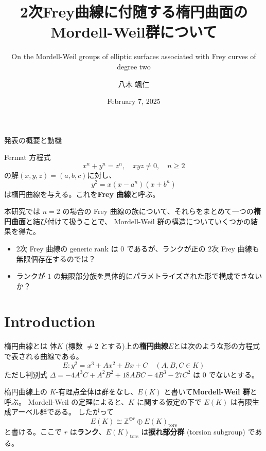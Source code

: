 \documentclass{classes/mybeamer}
\title{2次Frey曲線に付随する楕円曲面のMordell-Weil群について}
\subtitle{On the Mordell-Weil groups of elliptic surfaces associated with Frey curves of degree two}
\author{八木 颯仁}
\institute{慶應義塾大学 栗原研究室 修士2年}
\date{February 7, 2025}
\begin{document}
\begin{frame}
    \titlepage
\end{frame}

\begin{frame}{発表の概要と動機}
    \begin{dfn*}
        Fermat 方程式
        \begin{equation}
            x^n + y^n = z^n, \quad xyz \neq 0, \quad n \geq 2
        \end{equation}
        の解$(x, y, z)=(a,b,c)$に対し、
        \begin{equation}
            y^2 = x (x-a^n) (x+b^n)
        \end{equation}
        は楕円曲線を与える。これを\color{blue}\textbf{Frey 曲線}\color{black}と呼ぶ。
    \end{dfn*}
    本研究では $n=2$ の場合の Frey 曲線の族について、それらをまとめて一つの\textbf{楕円曲面}と結び付けて扱うことで、 Mordell-Weil 群の構造についていくつかの結果を得た。
    \begin{itemize}
        \item 2次 Frey 曲線の generic rank は $0$ であるが、ランクが正の 2次 Frey 曲線も無限個存在するのでは？
        \item ランクが $1$ の無限部分族を具体的にパラメトライズされた形で構成できないか？
    \end{itemize}
    \vspace{1em}
    \tableofcontents
\end{frame}

\section{Introduction}
\begin{frame}{楕円曲線とは}
    体$K$ (標数 $\neq2$ とする)上の\color{blue}\textbf{楕円曲線}\color{black}$E$とは次のような形の方程式で表される曲線である。
    \begin{equation*}
        E: y^{2} = x^{3} + Ax^2 + Bx + C \quad (A,B,C \in K)
    \end{equation*}
    ただし判別式 $\Delta = -4A^3C + A^2B^2 + 18ABC - 4B^3 - 27C^2$ は $0$ でないとする。

    \vspace{1cm}

    楕円曲線上の $K$-有理点全体は群をなし、$E(K)$ と書いて\color{blue}\textbf{Mordell-Weil 群}\color{black}と呼ぶ。
    Mordell-Weil の定理によると、$K$ に関する仮定の下で $E(K)$ は有限生成アーベル群である。
    したがって
    \begin{equation*}
        E(K) \cong \mathbb{Z}^{\oplus r} \oplus E(K)_{\mathrm{tors}}
    \end{equation*}
    と書ける。ここで $r$ は\color{blue}\textbf{ランク}\color{black}、$E(K)_{\mathrm{tors}}$ は\color{blue}\textbf{捩れ部分群}\color{black} (torsion subgroup) である。
\end{frame}
\end{document}
